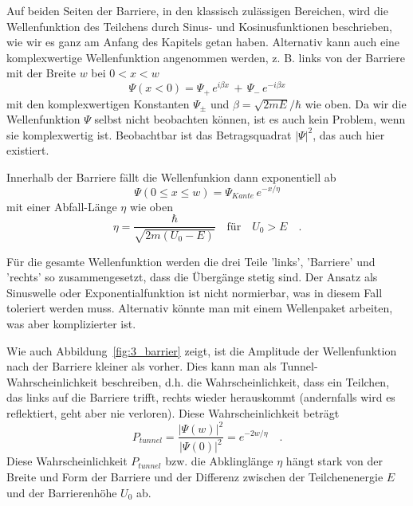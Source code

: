 Auf beiden Seiten der Barriere, in den klassisch zulässigen Bereichen, wird die Wellenfunktion des Teilchens durch Sinus- und Kosinusfunktionen beschrieben, wie wir es ganz am Anfang des Kapitels getan haben. Alternativ kann auch eine komplexwertige Wellenfunktion angenommen werden, z. B. links von der Barriere mit der Breite $w$ bei $0 < x < w$
\begin{equation}
    \Psi(x < 0) = \Psi_{+}\,  e^{i \beta x} \, + \, \Psi_{-} \,e^{-i \beta x}
\end{equation}
mit den komplexwertigen Konstanten $\Psi_\pm$  und $\beta = \sqrt{2 m E }/ \hbar$ wie oben. Da wir die Wellenfunktion $\Psi$ selbst nicht beobachten können, ist es auch kein Problem, wenn sie komplexwertig ist. Beobachtbar ist das Betragsquadrat $|\Psi|^2$, das auch hier existiert.

Innerhalb der Barriere fällt die Wellenfunkion dann exponentiell ab
\begin{equation}
    \Psi(0 \le x \le w) = \Psi_{Kante} \, e^{- x / \eta}
\end{equation}
mit einer Abfall-Länge $\eta$ wie oben 
\begin{equation}
    \eta = \frac{\hbar}{\sqrt{2m ( U_0 - E)}} \quad \text{für} \quad U_0 > E \quad .
\end{equation}

Für die gesamte Wellenfunktion werden die drei Teile 'links', 'Barriere' und 'rechts' so zusammengesetzt, dass die Übergänge stetig sind.  Der Ansatz als Sinuswelle oder Exponentialfunktion ist nicht normierbar, was in diesem Fall toleriert werden muss. Alternativ könnte man mit einem Wellenpaket arbeiten, was aber komplizierter ist.

Wie auch Abbildung~\ref{fig:3_barrier} zeigt, ist die Amplitude der Wellenfunktion nach der Barriere kleiner als vorher. Dies kann man als Tunnel-Wahrscheinlichkeit beschreiben, d.h. die Wahrscheinlichkeit, dass ein Teilchen, das links auf die Barriere trifft, rechts wieder herauskommt (andernfalls wird es reflektiert, geht aber nie verloren). Diese Wahrscheinlichkeit beträgt
\begin{equation}
    P_{tunnel} = \frac{|\Psi(w)|^2} {|\Psi(0)|^2} = e^{-2 w / \eta} \quad .
\end{equation}
Diese Wahrscheinlichkeit $P_{tunnel}$ bzw. die Abklinglänge $\eta$ hängt stark von der Breite und Form der Barriere und der Differenz zwischen der Teilchenenergie $E$ und der Barrierenhöhe $U_0$ ab.

